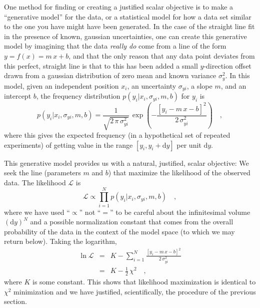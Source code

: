 \documentclass[12pt]{article}
\renewcommand{\d}{\mathrm{d}}
\newcommand{\like}{\mathscr{L}}
\begin{document}
One method for finding or creating a justified scalar objective is to
make a ``generative model'' for the data, or a statistical model for
how a data set similar to the one you have might have been generated.
In the case of the straight line fit in the presence of known,
gaussian uncertainties, one can create this generative model by
imagining that the data \emph{really do} come from a line of the form
$y = f(x) = m\,x+b$, and that the only reason that any data point
deviates from this perfect, straight line is that to this has been
added a small $y$-direction offset drawn from a gaussian distribution
of zero mean and known variance $\sigma_y^2$.  In this model, given an
independent position $x_i$, an uncertainty $\sigma_{yi}$, a slope $m$,
and an intercept $b$, the frequency distribution
$p(y_i|x_i,\sigma_{yi},m,b)$ for $y_i$ is
\begin{equation}
p(y_i|x_i,\sigma_{yi},m,b) = \frac{1}{\sqrt{2\,\pi\,\sigma_{yi}^2}}
 \,\exp\left(-\frac{[y_i - m\,x - b]^2}{2\,\sigma_{yi}^2}\right) \quad ,
\end{equation}
where this gives the expected frequency (in a hypothetical set of
repeated experiments) of getting value in the range $[y_i,y_i+\d y]$
per unit $\d y$.

This generative model provides us with a natural, justified, scalar
objective: We seek the line (parameters $m$ and $b$) that maximize the
likelihood of the observed data.  The likelihood $\like$ is
\begin{equation}\label{eq:like}
\like \propto \prod_{i=1}^N p(y_i|x_i,\sigma_{yi},m,b) \quad ,
\end{equation}
where we have used ``$\propto$'' not ``$=$'' to be careful about the
infinitesimal volume $(\d y)^N$ and a possible normalization constant
that comes from the overall probability of the data in the context of
the model space (to which we may return below).  Taking the logarithm,
\begin{eqnarray}\displaystyle
\ln\like
 & = & K - \sum_{i=1}^N \frac{[y_i - m\,x - b]^2}{2\,\sigma_{yi}^2} \nonumber\\
 & = & K - \frac{1}{2}\,\chi^2 \quad ,
\end{eqnarray}
where $K$ is some constant.  This shows that likelihood maximization
is identical to $\chi^2$ minimization and we have justified,
scientifically, the procedure of the previous section.
\end{document}
